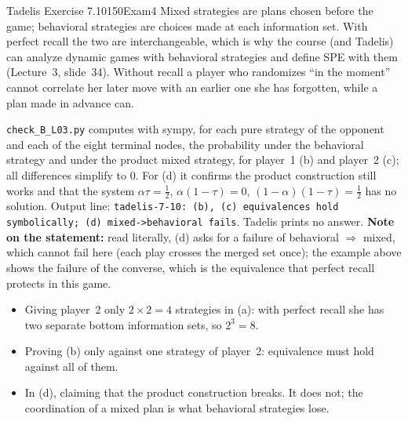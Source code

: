 \begin{exsol}{Tadelis Exercise 7.10}{150}{Exam}{4}
\interp Mixed strategies are plans chosen before the game; behavioral strategies are choices made
at each information set. With perfect recall the two are interchangeable, which is why the course
(and Tadelis) can analyze dynamic games with behavioral strategies and define SPE with them
(Lecture~3, slide~34). Without recall a player who randomizes ``in the moment'' cannot correlate
her later move with an earlier one she has forgotten, while a plan made in advance can.

\verify \texttt{check\_B\_L03.py} computes with sympy, for each pure strategy of the opponent and
each of the eight terminal nodes, the probability under the behavioral strategy and under the
product mixed strategy, for player~1 (b) and player~2 (c); all differences simplify to 0. For (d)
it confirms the product construction still works and that the system $\alpha\tau = \frac12$,
$\alpha(1-\tau) = 0$, $(1-\alpha)(1-\tau) = \frac12$ has no solution. Output line:
\texttt{tadelis-7-10: (b), (c) equivalences hold symbolically; (d) mixed->behavioral fails}.
Tadelis prints no answer. \textbf{Note on the statement:} read literally, (d) asks for a failure of
behavioral $\Rightarrow$ mixed, which cannot fail here (each play crosses the merged set once); the
example above shows the failure of the converse, which is the equivalence that perfect recall
protects in this game.

\mistakes
\begin{itemize}
  \item Giving player~2 only $2 \times 2 = 4$ strategies in (a): with perfect recall she has two
  separate bottom information sets, so $2^3 = 8$.
  \item Proving (b) only against one strategy of player~2: equivalence must hold against all of them.
  \item In (d), claiming that the product construction breaks. It does not; the coordination of a
  mixed plan is what behavioral strategies lose.
\end{itemize}

\end{exsol}
